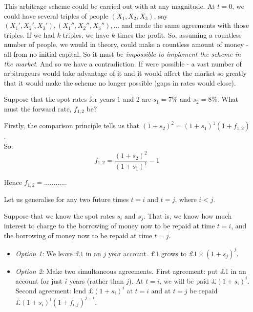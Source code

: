 \frmrule

This arbitrage scheme could be carried out with at any magnitude. 
At $t = 0$, we could have several triples of people $(X_1, X_2, X_3)$, say
$(X_1',X_2',X_3'),  (X_1'',X_2'',X_3''),  ...$ and made the same agreements with 
those triples. 
If we had $k$ triples, we have $k$ times the profit. So, assuming 
a countless number of people, we would in theory, 
could make a countless amount of money - all from no initial capital. 
So it must be \textit{impossible to implement the scheme in the market}. And so 
we have a contradiction. If were possible - 
a vast number of arbitrageurs would take advantage of it and it would affect the 
market so greatly that it would make the scheme no longer possible 
(gaps in rates would close). 

\frmrule



\begin{example}
Suppose that the spot rates for years 1 and 2 are $s_1 = 7\%$ and $s_2 = 8\%$. 
What must the forward rate, $f_{1,2}$ be?

Firstly, the comparison principle tells us that $(1 + s_2)^2 = (1 + s_1)^1(1 + f_{1,2})$. \\
So:
$$f_{1,2} =  \frac{(1 + s_2)^2}{(1 + s_1)^1} - 1$$

Hence $f_{1,2} = ............$


\end{example}


\frmrule

Let us generalise for any two future times $t = i$ and $t = j$, where $i < j$.

\begin{example}
Suppose that we know the spot rates $s_i$ and $s_j$. That is, 
we know how much interest to charge to the borrowing of money 
now to be repaid at time $t = i$, and the borrowing of money now to be repaid at time $t = j$. 
\begin{itemize}
\item \textit{Option 1:} We leave $\pounds 1$ in an $j$ year account. $\pounds 1$ grows to $\pounds 1 \times (1 + s_j)^j$. 
\item \textit{Option 2:} Make two simultaneous agreements. First agreement:
put $\pounds 1$ in an account for just $i$ years (rather than $j$). 
At $t = i$, we will be paid $\pounds (1 + s_i)^i$.
Second agreement: lend $\pounds (1 + s_i)^i$
at $t = i$ and  at $t = j$ be repaid $\pounds (1 + s_i)^i (1 + f_{i,j})^{j-i}$. 
\end{itemize}
\end{example}

